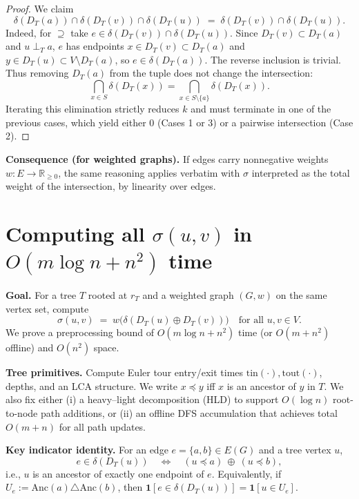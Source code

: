 \documentclass[11pt,letterpaper]{article}
\begin{document}
\begin{proof}
We claim
\begin{equation}\label{eq:elim}
\delta(D_T(a))\cap\delta(D_T(v))\cap\delta(D_T(u))
\;=\;
\delta(D_T(v))\cap\delta(D_T(u)).
\end{equation}
Indeed, for $\supseteq$ take $e\in\delta(D_T(v))\cap\delta(D_T(u))$.
Since $D_T(v)\subset D_T(a)$ and $u\perp_T a$, $e$ has endpoints
$x\in D_T(v)\subset D_T(a)$ and $y\in D_T(u)\subset V\setminus D_T(a)$,
so $e\in\delta(D_T(a))$. The reverse inclusion is trivial.
Thus removing $D_T(a)$ from the tuple does not change the intersection:
\[
\bigcap_{x\in S}\delta(D_T(x))
=
\bigcap_{x\in S\setminus\{a\}}\delta(D_T(x)).
\]
Iterating this elimination strictly reduces $k$ and must terminate
in one of the previous cases, which yield either $0$ (Cases 1 or 3)
or a pairwise intersection (Case 2).
\end{proof}
\smallskip
\textbf{Consequence (for weighted graphs).}
If edges carry nonnegative weights $w:E\to\mathbb{R}_{\ge0}$, the same
reasoning applies verbatim with $\sigma$ interpreted as the total weight
of the intersection, by linearity over edges.
\section{Computing all $\sigma(u,v)$ in $O(m\log n+n^2)$ time}
\label{app:sigma}

\noindent\textbf{Goal.}
For a tree $T$ rooted at $r_T$ and a weighted graph $(G,w)$ on the same vertex set,
compute
\[
\sigma(u,v)\;=\;w\!\bigl(\delta(D_T(u)\oplus D_T(v))\bigr)
\quad\text{for all } u,v\in V.
\]
We prove a preprocessing bound of $O(m\log n+n^2)$ time (or $O(m+n^2)$ offline) and $O(n^2)$ space.

\medskip
\noindent\textbf{Tree primitives.}
Compute Euler tour entry/exit times $\mathrm{tin}(\cdot),\mathrm{tout}(\cdot)$, depths, and an LCA structure.
We write $x\preceq y$ iff $x$ is an ancestor of $y$ in $T$.
We also fix either (i) a heavy--light decomposition (HLD) to support $O(\log n)$
root-to-node path additions, or (ii) an offline DFS accumulation that achieves total $O(m+n)$ for all path updates.

\medskip
\noindent\textbf{Key indicator identity.}
For an edge $e=\{a,b\}\in E(G)$ and a tree vertex $u$,
\[
e\in\delta(D_T(u))
\quad\Longleftrightarrow\quad
(u\preceq a)\ \oplus\ (u\preceq b),
\]
i.e., $u$ is an ancestor of exactly one endpoint of $e$.
Equivalently, if $U_e:=\mathrm{Anc}(a)\triangle \mathrm{Anc}(b)$,
then $\mathbf{1}[e\in\delta(D_T(u))]=\mathbf{1}[u\in U_e]$.
\end{document}
